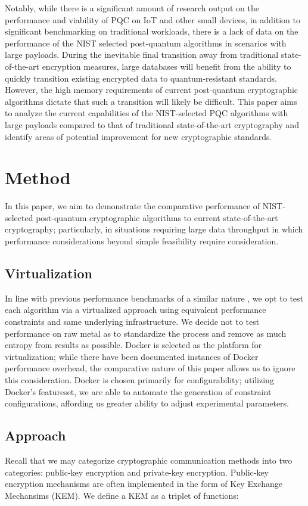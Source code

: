 \documentclass[12pt]{article}
\begin{document}
Notably, while there is a significant amount of research output on the performance and viability of PQC on IoT and other small devices, in addition to significant benchmarking on traditional workloads, there is a lack of data on the performance of the NIST selected post-quantum algorithms in scenarios with large payloads. 
During the inevitable final transition away from traditional state-of-the-art encryption measures, large databases will benefit from the ability to quickly transition existing encrypted data to quantum-resistant standards. 
However, the high memory requirements of current post-quantum cryptographic algorithms dictate that such a transition will likely be difficult. 
This paper aims to analyze the current capabilities of the NIST-selected PQC algorithms with large payloads compared to that of traditional state-of-the-art cryptography and identify areas of potential improvement for new cryptographic standards. 

\section{Method}
In this paper, we aim to demonstrate the comparative performance of NIST-selected post-quantum cryptographic algorithms to current state-of-the-art cryptography; particularly, in situations requiring large data throughput in which performance considerations beyond simple feasibility require consideration. 
\subsection{Virtualization}
In line with previous performance benchmarks of a similar nature \autocite{liu_iot-nums_2019}, we opt to test each algorithm via a virtualized approach using equivalent performance constraints and same underlying infrastructure.
We decide not to test performance on raw metal as to standardize the process and remove as much entropy from results as possible. 
Docker is selected as the platform for virtualization; while there have been documented instances of Docker performance overhead, the comparative nature of this paper allows us to ignore this consideration. 
Docker is chosen primarily for configurability; utilizing Docker's featureset, we are able to automate the generation of constraint configurations, affording us greater ability to adjust experimental parameters. 


\subsection{Approach}
Recall that we may categorize cryptographic communication methods into two categories: public-key encryption and private-key encryption. 
Public-key encryption mechanisms are often implemented in the form of Key Exchange Mechansims (KEM). 
We define a KEM as a triplet of functions:  
\printbibliography
\end{document}
